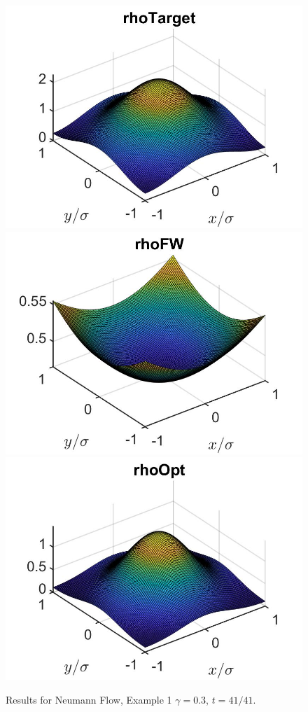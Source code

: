 \documentclass[11pt, a4paper]{article}
\theoremstyle{definition}
\begin{document}
\begin{figure}[h]
	\includegraphics[scale=0.3]{rhoHat2DN1b.jpg}
	\includegraphics[scale=0.3]{rhoFW2DN1b.jpg}
	\includegraphics[scale=0.3]{rhoOpt2DN1b.jpg}
	\caption{Results for Neumann Flow, Example 1 $\gamma = 0.3$, $t = 41/41$.}
	\label{Ex12DN1b}
\end{figure}
\end{document}
